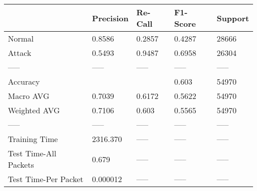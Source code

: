 \begin{tabular}{lllll}
\toprule
{} & Precision & Re-Call & F1-Score & Support \\
\midrule
Normal                &    0.8586 &  0.2857 &   0.4287 &   28666 \\
Attack                &    0.5493 &  0.9487 &   0.6958 &   26304 \\
-----                 &     ----- &   ----- &    ----- &   ----- \\
Accuracy              &           &         &    0.603 &   54970 \\
Macro AVG             &    0.7039 &  0.6172 &   0.5622 &   54970 \\
Weighted AVG          &    0.7106 &   0.603 &   0.5565 &   54970 \\
-----                 &     ----- &   ----- &    ----- &   ----- \\
Training Time         &  2316.370 &   ----- &    ----- &   ----- \\
Test Time-All Packets &     0.679 &   ----- &    ----- &   ----- \\
Test Time-Per Packet  &  0.000012 &   ----- &    ----- &   ----- \\
\bottomrule
\end{tabular}
